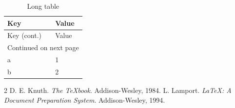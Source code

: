 \documentclass[sn-mathphys-ay]{sn-jnl}
\theoremstyle{thmstylethree}
\begin{document}
\begin{longtable}{ll}
\caption{Long table}\label{tab:long}\\
\toprule
Key & Value \\
\midrule
\endfirsthead
Key (cont.) & Value \\
\midrule
\endhead
\multicolumn{2}{r}{Continued on next page} \\
\endfoot
\bottomrule
\endlastfoot
a & 1 \\
b & 2 \\
\end{longtable}

\begin{thebibliography}{2}
 D. E. Knuth. \newblock \emph{The {\TeX}book}. \newblock Addison-Wesley, 1984.
 L. Lamport. \newblock \emph{{\LaTeX}: A Document Preparation System}. \newblock Addison-Wesley, 1994.
\end{thebibliography}
\end{document}
